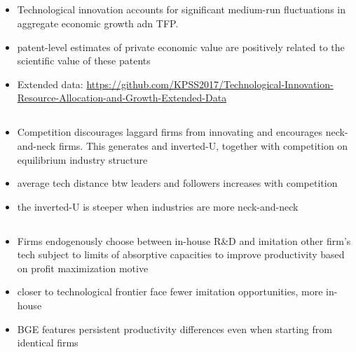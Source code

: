 \documentclass[10pt]{article} %
\begin{document}
    \subsection{\cite{BaiJinLu2023}}

    \subsection{\cite{AdaoBerajaPandalaiNayar2020}}

    \subsection{\cite{LiuMa2023}}

    \subsection{\cite{KoganPapanikolaouSeruStoffman2017}}
    \begin{itemize}
        \item Technological innovation accounts for significant medium-run fluctuations in aggregate economic growth adn TFP.
        \item patent-level estimates of private economic value are positively related to the scientific value of these patents
        \item Extended data: \url{https://github.com/KPSS2017/Technological-Innovation-Resource-Allocation-and-Growth-Extended-Data}
    \end{itemize}

    \subsection{\cite{AghionBloomBlundellGriffithHowitt2005}}
    \begin{itemize}
        \item Competition discourages laggard firms from innovating and encourages neck-and-neck firms. This generates and inverted-U, together with competition on equilibrium industry structure
        \item average tech distance  btw leaders and followers increases with competition
        \item the inverted-U is steeper when industries are more neck-and-neck
    \end{itemize}

    \subsection{\cite{KoenigLorenzZilibotti2016}}
    \begin{itemize}
        \item Firms endogenously choose between in-house R\&D and imitation other firm's tech subject to limits of absorptive capacities to improve productivity based on profit maximization motive
        \item closer to technological frontier face fewer imitation opportunities, more in-house
        \item BGE features persistent productivity differences even when starting from identical firms
    \end{itemize}
\end{document}
